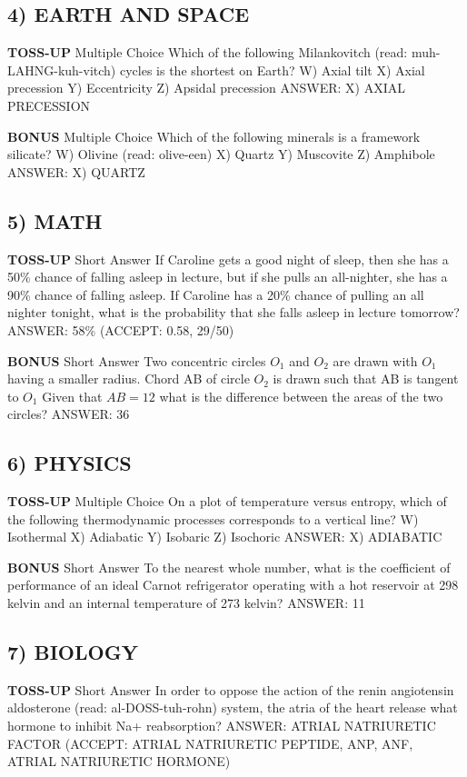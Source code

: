 \documentclass{article}
\begin{document}
\subsection*{4) EARTH AND SPACE}
\textbf{TOSS-UP}
Multiple Choice Which of the following Milankovitch (read: muh-LAHNG-kuh-vitch) cycles is the shortest on Earth?
W) Axial tilt
X) Axial precession
Y) Eccentricity
Z) Apsidal precession
ANSWER: X) AXIAL PRECESSION

\textbf{BONUS}
Multiple Choice Which of the following minerals is a framework silicate?
W) Olivine (read: olive-een)
X) Quartz
Y) Muscovite
Z) Amphibole
ANSWER: X) QUARTZ

\subsection*{5) MATH}
\textbf{TOSS-UP}
Short Answer If Caroline gets a good night of sleep, then she has a 50\% chance of falling asleep in lecture, but if she pulls an all-nighter, she has a 90\% chance of falling asleep. If Caroline has a 20\% chance of pulling an all nighter tonight, what is the probability that she falls asleep in lecture tomorrow?
ANSWER: 58\% (ACCEPT: 0.58, 29/50)

\textbf{BONUS}
Short Answer Two concentric circles $O_{1}$ and $O_{2}$ are drawn with $O_{1}$ having a smaller radius. Chord AB of circle $O_{2}$ is drawn such that AB is tangent to $O_{1}$ Given that $AB=12$ what is the difference between the areas of the two circles?
ANSWER: 36\pi

\subsection*{6) PHYSICS}
\textbf{TOSS-UP}
Multiple Choice On a plot of temperature versus entropy, which of the following thermodynamic processes corresponds to a vertical line?
W) Isothermal
X) Adiabatic
Y) Isobaric
Z) Isochoric
ANSWER: X) ADIABATIC

\textbf{BONUS}
Short Answer To the nearest whole number, what is the coefficient of performance of an ideal Carnot refrigerator operating with a hot reservoir at 298 kelvin and an internal temperature of 273 kelvin?
ANSWER: 11

\subsection*{7) BIOLOGY}
\textbf{TOSS-UP}
Short Answer In order to oppose the action of the renin angiotensin aldosterone (read: al-DOSS-tuh-rohn) system, the atria of the heart release what hormone to inhibit Na+ reabsorption?
ANSWER: ATRIAL NATRIURETIC FACTOR (ACCEPT: ATRIAL NATRIURETIC PEPTIDE, ANP, ANF, ATRIAL NATRIURETIC HORMONE)
\end{document}
